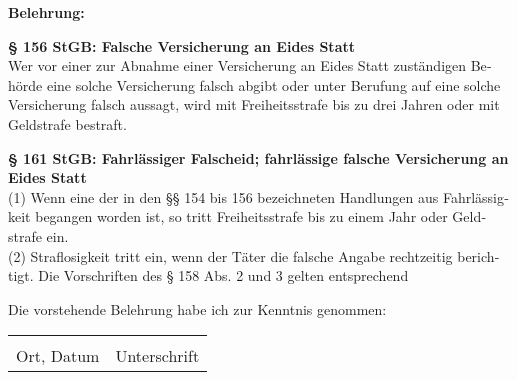 \begin{otherlanguage}{ngerman}
\begin{small}
	\textbf{Belehrung:}

	\textbf{§ 156 StGB: Falsche Versicherung an Eides Statt}\\
	Wer vor einer zur Abnahme einer Versicherung an Eides Statt zuständigen Behörde eine solche Versicherung falsch abgibt oder unter Berufung auf eine solche Versicherung falsch aussagt, wird mit Freiheitsstrafe bis zu drei Jahren oder mit Geldstrafe bestraft.

	\textbf{§ 161 StGB: Fahrlässiger Falscheid; fahrlässige falsche Versicherung an Eides Statt}\\
	(1) Wenn eine der in den §§ 154 bis 156 bezeichneten Handlungen aus Fahrlässigkeit begangen worden ist, so tritt Freiheitsstrafe bis zu einem Jahr oder Geldstrafe ein.\\
	(2) Straflosigkeit tritt ein, wenn der Täter die falsche Angabe rechtzeitig berichtigt. Die Vorschriften des § 158 Abs. 2 und 3 gelten entsprechend
\end{small}

\vspace{0.3cm}

Die vorstehende Belehrung habe ich zur Kenntnis genommen:

\vspace{0.3cm}



\begin{tabular}{@{}p{8cm}p{5.8cm}}
	\underline{\smash{Aachen, den \today}} & \underline{\hspace{5.8cm}}\\
	\vspace{0.02cm}Ort, Datum & \vspace{0.02cm}Unterschrift \\
\end{tabular}

\endgroup
\cleardoublepage

\end{otherlanguage}


